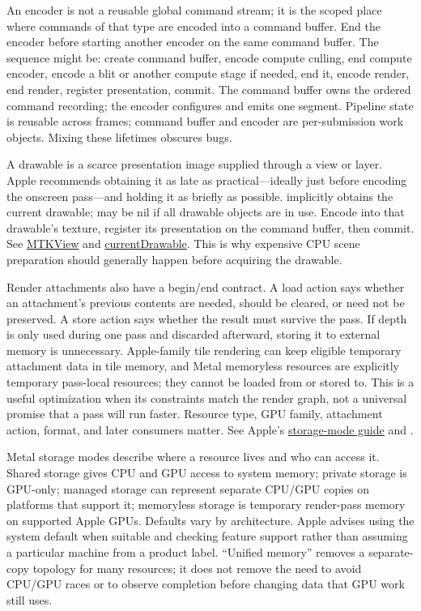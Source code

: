 An encoder is not a reusable global command stream; it is the scoped place where commands of that type are encoded into a command buffer. End the encoder before starting another encoder on the same command buffer. The sequence might be: create command buffer, encode compute culling, end compute encoder, encode a blit or another compute stage if needed, end it, encode render, end render, register presentation, commit. The command buffer owns the ordered command recording; the encoder configures and emits one segment. Pipeline state is reusable across frames; command buffer and encoder are per-submission work objects. Mixing these lifetimes obscures bugs.

A drawable is a scarce presentation image supplied through a view or layer. Apple recommends obtaining it as late as practical---ideally just before encoding the onscreen pass---and holding it as briefly as possible.  implicitly obtains the current drawable;  may be nil if all drawable objects are in use. Encode into that drawable's texture, register its presentation on the command buffer, then commit. See \href{https://developer.apple.com/documentation/metalkit/mtkview/}{MTKView} and \href{https://developer.apple.com/documentation/MetalKit/MTKView/currentDrawable}{currentDrawable}. This is why expensive CPU scene preparation should generally happen before acquiring the drawable.

Render attachments also have a begin/end contract. A load action says whether an attachment's previous contents are needed, should be cleared, or need not be preserved. A store action says whether the result must survive the pass. If depth is only used during one pass and discarded afterward, storing it to external memory is unnecessary. Apple-family tile rendering can keep eligible temporary attachment data in tile memory, and Metal memoryless resources are explicitly temporary pass-local resources; they cannot be loaded from or stored to. This is a useful optimization when its constraints match the render graph, not a universal promise that a pass will run faster. Resource type, GPU family, attachment action, format, and later consumers matter. See Apple's \href{https://developer.apple.com/documentation/metal/setting-resource-storage-modes}{storage-mode guide} and \href{https://developer.apple.com/documentation/metal/mtlresourceoptions/storagemodememoryless}{}.

Metal storage modes describe where a resource lives and who can access it. Shared storage gives CPU and GPU access to system memory; private storage is GPU-only; managed storage can represent separate CPU/GPU copies on platforms that support it; memoryless storage is temporary render-pass memory on supported Apple GPUs. Defaults vary by architecture. Apple advises using the system default when suitable and checking feature support rather than assuming a particular machine from a product label. ``Unified memory'' removes a separate-copy topology for many resources; it does not remove the need to avoid CPU/GPU races or to observe completion before changing data that GPU work still uses.

